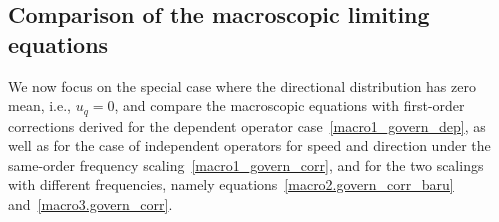 \documentclass[a4paper]{article}
\theoremstyle{Theorem}\newtheorem{proposition}{Proposition}[section]
\theoremstyle{Remark}\newtheorem{remark}{Remark}[section]
\theoremstyle{Theorem}\newtheorem{theorem}{Theorem}[section]
\begin{document}
\subsection{Comparison of the macroscopic limiting equations}
We now focus on the special case where the directional distribution has zero mean, i.e., $u_q=0$, and compare the macroscopic equations with first-order corrections derived for the dependent operator case~\eqref{macro1_govern_dep}, as well as for the case of independent operators for speed and direction under the same-order frequency scaling~\eqref{macro1_govern_corr}, and for the two scalings with different frequencies, namely equations~\eqref{macro2.govern_corr_baru} and~\eqref{macro3.govern_corr}. 
\end{document}
